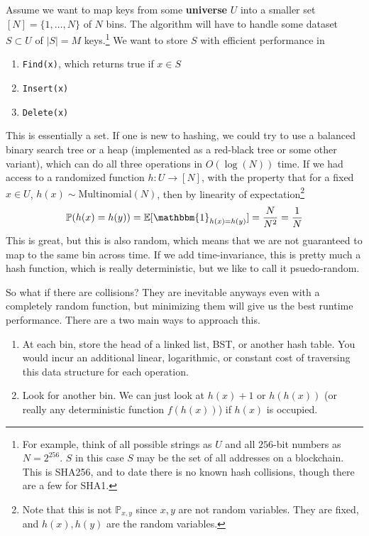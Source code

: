 \documentclass{article}
\begin{document}
    Assume we want to map keys from some \textbf{universe} $U$ into a smaller set $[N] = \{1, \ldots, N\}$ of $N$ bins. The algorithm will have to handle some dataset $S \subset U$ of $|S| = M$ keys.\footnote{For example, think of all possible strings as $U$ and all $256$-bit numbers as $N = 2^{256}$. $S$ in this case $S$ may be the set of all addresses on a blockchain. This is SHA256, and to date there is no known hash collisions, though there are a few for SHA1.} We want to store $S$ with efficient performance in 
    \begin{enumerate}
      \item \texttt{Find(x)}, which returns true if $x \in S$
      \item \texttt{Insert(x)} 
      \item \texttt{Delete(x)}
      \end{enumerate}
    This is essentially a set. If one is new to hashing, we could try to use a balanced binary search tree or a heap (implemented as a red-black tree or some other variant), which can do all three operations in $O(\log(N))$ time. If we had access to a randomized function $h: U \rightarrow [N]$, with the property that for a fixed $x \in U$, $h(x) \sim \mathrm{Multinomial}(N)$, then by linearity of expectation\footnote{Note that this is not $\mathbb{P}_{x, y}$ since $x, y$ are not random variables. They are fixed, and $h(x), h(y)$ are the random variables. }
    \begin{equation}
      \mathbb{P}(h(x) = h(y)) = \mathbb{E}[\mathbbm{1}_{h(x) = h(y)}] = \frac{N}{N^2} = \frac{1}{N}
    \end{equation}
    This is great, but this is also random, which means that we are not guaranteed to map to the same bin across time. If we add time-invariance, this is pretty much a hash function, which is really deterministic, but we like to call it psuedo-random. 

    So what if there are collisions? They are inevitable anyways even with a completely random function, but minimizing them will give us the best runtime performance. There are a two main ways to approach this. 
    \begin{enumerate}
      \item At each bin, store the head of a linked list, BST, or another hash table. You would incur an additional linear, logarithmic, or constant cost of traversing this data structure for each operation.  
      \item Look for another bin. We can just look at $h(x) + 1$ or $h(h(x))$ (or really any deterministic function $f(h(x))$) if $h(x)$ is occupied. 
    \end{enumerate}
\end{document}
